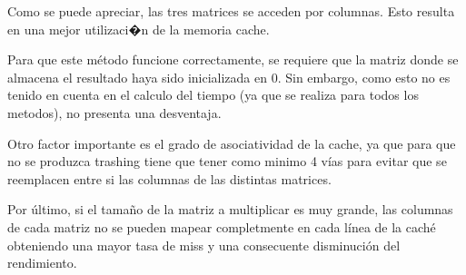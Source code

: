 \documentclass{article}
\begin{document}
Como se puede apreciar, las tres matrices se acceden por columnas. Esto resulta en una mejor utilizaci�n de la memoria cache.

Para que este método funcione correctamente, se requiere que la matriz donde se almacena el resultado haya sido inicializada en 0. Sin embargo, como esto no es tenido en cuenta en el calculo del tiempo (ya que se realiza para todos los metodos), no presenta una desventaja.

Otro factor importante es el grado de asociatividad de la cache, ya que para que no se produzca trashing tiene que tener como minimo 4 vías para evitar que se reemplacen entre si las columnas de las distintas matrices.

Por último, si el tamaño de la matriz a multiplicar es muy grande, las columnas de cada matriz no se pueden mapear completmente en cada línea de la caché obteniendo una mayor tasa de miss y una consecuente disminución del rendimiento.
\end{document}
